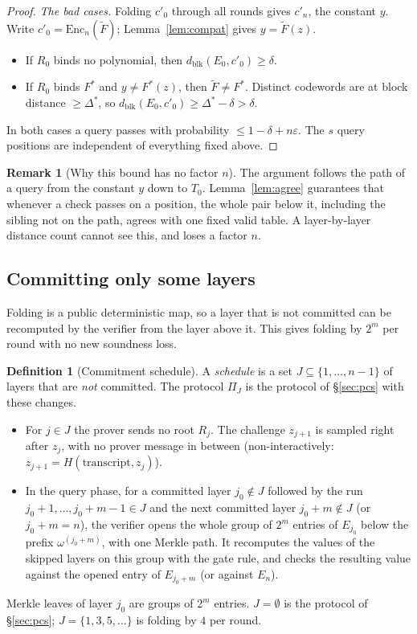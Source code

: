 \documentclass[11pt]{article}
\theoremstyle{definition}
\newtheorem{definition}[theorem]{Definition}
\newtheorem{remark}[theorem]{Remark}
\newcommand{\Enc}{\mathrm{Enc}}
\newcommand{\dblk}{d_{\mathrm{blk}}}
\begin{document}
\begin{proof}
\emph{The bad cases.} Folding $c'_0$ through all rounds gives $c'_n$, the constant $y$. Write
$c'_0=\Enc_n(\widetilde F)$; Lemma~\ref{lem:compat} gives $y=\widetilde F(z)$.
\begin{itemize}[leftmargin=*]
\item If $R_0$ binds no polynomial, then $\dblk(E_0,c'_0)\ge\delta$.
\item If $R_0$ binds $F^{*}$ and $y\neq F^{*}(z)$, then $\widetilde F\neq F^{*}$. Distinct codewords are at
block distance $\ge\Delta^{*}$, so $\dblk(E_0,c'_0)\ge\Delta^{*}-\delta>\delta$.
\end{itemize}
In both cases a query passes with probability $\le1-\delta+n\varepsilon$. The $s$ query positions
are independent of everything fixed above.
\end{proof}

\begin{remark}[Why this bound has no factor $n$]
The argument follows the path of a query from the constant $y$ down to $T_0$. Lemma~\ref{lem:agree}
guarantees that whenever a check passes on a position, the whole pair below it, including the
sibling not on the path, agrees with one fixed valid table. A layer-by-layer distance count
cannot see this, and loses a factor $n$.
\end{remark}

\subsection{Committing only some layers}

Folding is a public deterministic map, so a layer that is not committed can be recomputed by the
verifier from the layer above it. This gives folding by $2^m$ per round with no new soundness loss.

\begin{definition}[Commitment schedule]
A \emph{schedule} is a set $J\subseteq\{1,\dots,n-1\}$ of layers that are \emph{not} committed. The
protocol $\Pi_J$ is the protocol of \S\ref{sec:pcs} with these changes.
\begin{itemize}[leftmargin=*]
\item For $j\in J$ the prover sends no root $R_j$. The challenge $z_{j+1}$ is sampled right after
$z_j$, with no prover message in between (non-interactively: $z_{j+1}=H(\text{transcript},z_j)$).
\item In the query phase, for a committed layer $j_0\notin J$ followed by the run $j_0+1,\dots,j_0+m-1\in J$
and the next committed layer $j_0+m\notin J$ (or $j_0+m=n$), the verifier opens the whole group of
$2^m$ entries of $E_{j_0}$ below the prefix $\omega^{(j_0+m)}$, with one Merkle path. It recomputes the
values of the skipped layers on this group with the gate rule, and checks the resulting value
against the opened entry of $E_{j_0+m}$ (or against $E_n$).
\end{itemize}
Merkle leaves of layer $j_0$ are groups of $2^m$ entries. $J=\emptyset$ is the protocol of
\S\ref{sec:pcs}; $J=\{1,3,5,\dots\}$ is folding by $4$ per round.
\end{definition}
\end{document}
